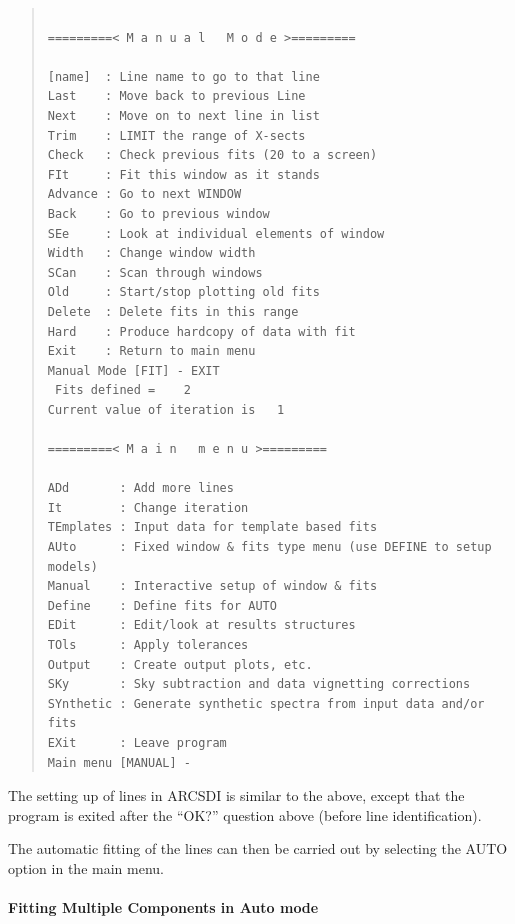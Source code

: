 \documentclass[11pt,twoside]{article}
\begin{document}
\begin{quote}\begin{verbatim}

=========< M a n u a l   M o d e >=========

[name]  : Line name to go to that line
Last    : Move back to previous Line
Next    : Move on to next line in list
Trim    : LIMIT the range of X-sects
Check   : Check previous fits (20 to a screen)
FIt     : Fit this window as it stands
Advance : Go to next WINDOW
Back    : Go to previous window
SEe     : Look at individual elements of window
Width   : Change window width
SCan    : Scan through windows
Old     : Start/stop plotting old fits
Delete  : Delete fits in this range
Hard    : Produce hardcopy of data with fit
Exit    : Return to main menu
Manual Mode [FIT] - EXIT
 Fits defined =    2
Current value of iteration is   1

=========< M a i n   m e n u >=========

ADd       : Add more lines
It        : Change iteration
TEmplates : Input data for template based fits
AUto      : Fixed window & fits type menu (use DEFINE to setup models)
Manual    : Interactive setup of window & fits
Define    : Define fits for AUTO
EDit      : Edit/look at results structures
TOls      : Apply tolerances
Output    : Create output plots, etc.
SKy       : Sky subtraction and data vignetting corrections
SYnthetic : Generate synthetic spectra from input data and/or fits
EXit      : Leave program
Main menu [MANUAL] -
\end{verbatim}\end{quote}

The setting up of lines in ARCSDI is similar to the above, except that
the program is exited after the ``OK?'' question above (before line
identification).

The automatic fitting of the lines can then be carried out by
selecting the AUTO option in the main menu.

\paragraph{Fitting Multiple Components in Auto mode}
\label{long.mb}
\end{document}
